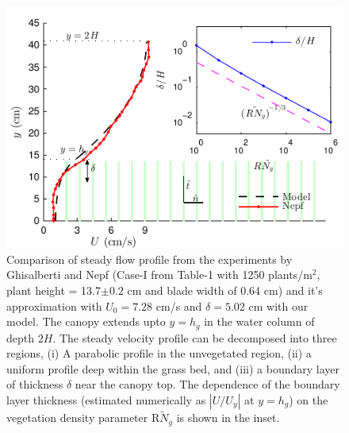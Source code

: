 \documentclass[aps,prl,twocolumn,superscriptaddress,10pt]{revtex4-1}  %
\newcommand{\hg}{h_g}
\newcommand{\Rey}{\text{R}}
\newcommand{\Ndg}{\tilde{N}_g}
\begin{document}
\begin{figure}
\includegraphics[scale=1]{Grass_Base_Nepf_shear}
\caption{Comparison of steady flow profile from the experiments by Ghisalberti and Nepf\cite{Nepf04} (Case-I from Table-1 with 1250 plants/m$^2$, 
plant height = 13.7$\pm 0.2$ cm and blade width of 0.64 cm)
 and it's approximation with $U_0=7.28$ cm/s and $\delta = 5.02$ cm with our model. The canopy extends upto $y=h_g$ in the water column of depth $2H$. 
The steady velocity profile can be decomposed into three regions, (i) A parabolic profile in the unvegetated region, (ii) a uniform profile deep within the grass bed, and (iii) a boundary layer of thickness $\delta$ near the canopy top. 
The dependence of the boundary layer thickness (estimated numerically as $|U/U_y|$ at $y=\hg$) on the vegetation density parameter $\Rey \Ndg$ is shown in the inset.}
\label{basicflow}
\end{figure}
\end{document}
